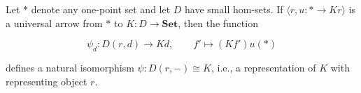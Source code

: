 Let $*$ denote any one-point set and let $D$ have small hom-sets. If $\langle r, u \colon * \to Kr \rangle$ is a universal arrow from $*$ to $K \colon D \to \mathbf{Set}$, then the function

$$
\psi_d \colon D(r, d) \to Kd, \qquad f' \mapsto (Kf')u(*)
$$

defines a natural isomorphism $\psi \colon D(r, -) \cong K$, i.e., a representation of $K$ with representing object $r$.
